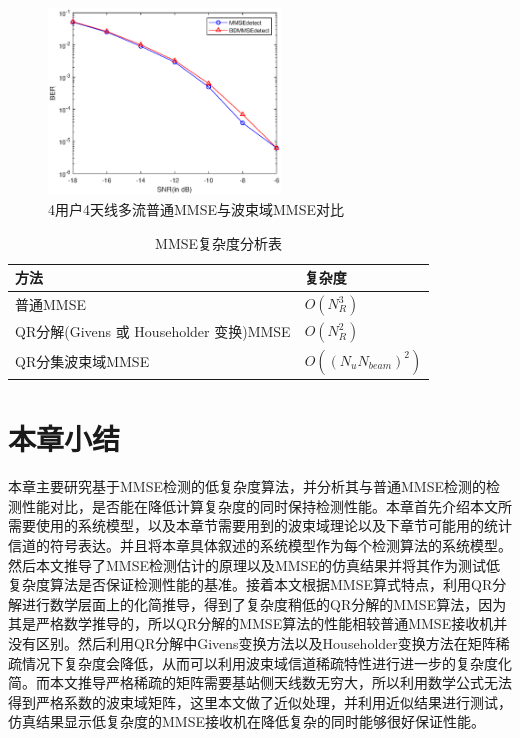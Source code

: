 \documentclass[bachelor,nocolorlinks, printoneside]{seuthesis} %
\begin{document}
\begin{Main}
\begin{figure}[htbp!]
\end{figure}
\begin{figure}[htbp!]
	\centering \includegraphics[width=0.55\textwidth]{img/3_7.eps} \caption{4用户4天线多流普通MMSE与波束域MMSE对比}
\end{figure}

\begin{table}[htbp]
	\centering
	\caption{\label{tab:complexity}MMSE复杂度分析表}
	\begin{tabular}{ll}
		\toprule
		方法 & 复杂度 \\
		\bottomrule
		普通MMSE & $O(N_R^3)$ \\
		QR分解(Givens 或 Householder 变换)MMSE & $O(N_R^2)$ \\
		QR分集波束域MMSE & $O((N_uN_{beam})^2)$ \\
	    \bottomrule
	\end{tabular}
\end{table}


\section{本章小结}
本章主要研究基于MMSE检测的低复杂度算法，并分析其与普通MMSE检测的检测性能对比，是否能在降低计算复杂度的同时保持检测性能。本章首先介绍本文所需要使用的系统模型，以及本章节需要用到的波束域理论以及下章节可能用的统计信道的符号表达。并且将本章具体叙述的系统模型作为每个检测算法的系统模型。然后本文推导了MMSE检测估计的原理以及MMSE的仿真结果并将其作为测试低复杂度算法是否保证检测性能的基准。接着本文根据MMSE算式特点，利用QR分解进行数学层面上的化简推导，得到了复杂度稍低的QR分解的MMSE算法，因为其是严格数学推导的，所以QR分解的MMSE算法的性能相较普通MMSE接收机并没有区别。然后利用QR分解中Givens变换方法以及Householder变换方法在矩阵稀疏情况下复杂度会降低，从而可以利用波束域信道稀疏特性进行进一步的复杂度化简。而本文推导严格稀疏的矩阵需要基站侧天线数无穷大，所以利用数学公式无法得到严格系数的波束域矩阵，这里本文做了近似处理，并利用近似结果进行测试，仿真结果显示低复杂度的MMSE接收机在降低复杂的同时能够很好保证性能。



\end{Main}
\end{document}
